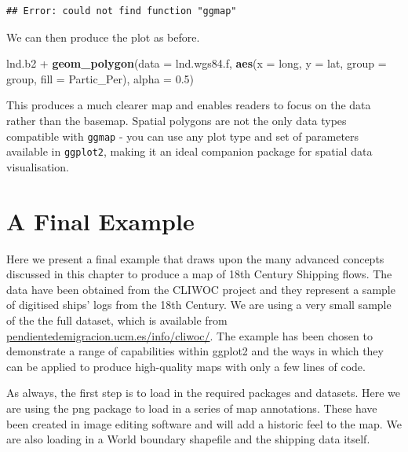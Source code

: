 \documentclass[]{article}
\newenvironment{Shaded}{}{}
\newcommand{\KeywordTok}[1]{\textcolor[rgb]{0.00,0.44,0.13}{\textbf{{#1}}}}
\newcommand{\DataTypeTok}[1]{\textcolor[rgb]{0.56,0.13,0.00}{{#1}}}
\newcommand{\FloatTok}[1]{\textcolor[rgb]{0.25,0.63,0.44}{{#1}}}
\newcommand{\StringTok}[1]{\textcolor[rgb]{0.25,0.44,0.63}{{#1}}}
\newcommand{\NormalTok}[1]{{#1}}
\begin{document}
\begin{verbatim}
## Error: could not find function "ggmap"
\end{verbatim}

We can then produce the plot as before.

\begin{Shaded}
\begin{Highlighting}[]
\NormalTok{lnd.b2 +}\StringTok{ }\KeywordTok{geom_polygon}\NormalTok{(}\DataTypeTok{data =} \NormalTok{lnd.wgs84.f, }\KeywordTok{aes}\NormalTok{(}\DataTypeTok{x =} \NormalTok{long, }\DataTypeTok{y =} \NormalTok{lat, }\DataTypeTok{group =} \NormalTok{group, }
    \DataTypeTok{fill =} \NormalTok{Partic_Per), }\DataTypeTok{alpha =} \FloatTok{0.5}\NormalTok{)}
\end{Highlighting}
\end{Shaded}

This produces a much clearer map and enables readers to focus on the
data rather than the basemap. Spatial polygons are not the only data
types compatible with \texttt{ggmap} - you can use any plot type and set
of parameters available in \texttt{ggplot2}, making it an ideal
companion package for spatial data visualisation.

\section{A Final Example}\label{a-final-example}

Here we present a final example that draws upon the many advanced
concepts discussed in this chapter to produce a map of 18th Century
Shipping flows. The data have been obtained from the CLIWOC project and
they represent a sample of digitised ships' logs from the 18th Century.
We are using a very small sample of the the full dataset, which is
available
from\\\href{http://pendientedemigracion.ucm.es/info/cliwoc/}{pendientedemigracion.ucm.es/info/cliwoc/}.
The example has been chosen to demonstrate a range of capabilities
within ggplot2 and the ways in which they can be applied to produce
high-quality maps with only a few lines of code.

As always, the first step is to load in the required packages and
datasets. Here we are using the png package to load in a series of map
annotations. These have been created in image editing software and will
add a historic feel to the map. We are also loading in a World boundary
shapefile and the shipping data itself.
\end{document}
